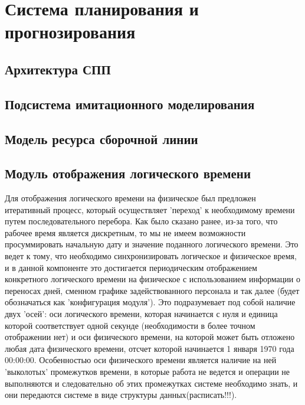 \chapter{Система планирования и прогнозирования}
\section{Архитектура СПП}
\section{Подсистема имитационного моделирования}
\section{Модель ресурса сборочной линии}
\section{Модуль отображения логического времени}
Для отображения логического времени на физическое был предложен итеративный процесс, который осуществляет 'переход' к необходимому времени путем последовательного перебора.
\newline
Как было сказано ранее, из-за того, что рабочее время является дискретным, то мы не имеем возможности просуммировать начальную дату и значение поданного логического времени. Это ведет к тому, что необходимо синхронизировать логическое и физическое время, и в данной компоненте это достигается периодическим отображением конкретного логического времени на физическое с использованием информации о переносах дней, сменном графике задействованного персонала и так далее (будет обозначаться как 'конфигурация модуля').
\newline
Это подразумевает под собой наличие двух 'осей': оси логического времени, которая начинается с нуля и единица которой соответствует одной секунде (необходимости в более точном отображении нет) и оси физического времени, на которой может быть отложено любая дата физического времени, отсчет которой начинается 1 января 1970 года 00:00:00. Особенностью оси физического времени является наличие на ней 'выколотых' промежутков времени, в которые работа не ведется и операции не выполняются и следовательно об этих промежутках системе необходимо знать, и они передаются системе в виде структуры данных(расписать!!!).
\newline
